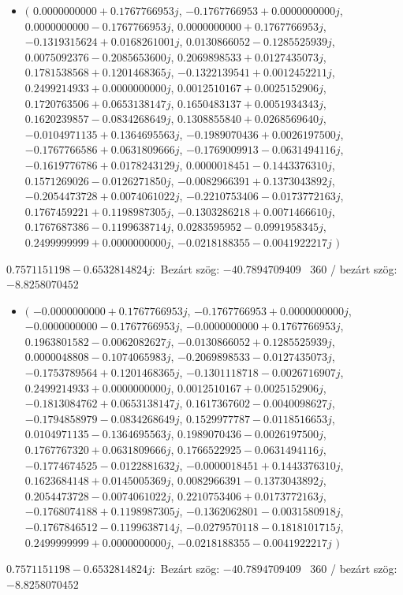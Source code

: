 \documentclass[14pt,a4paper]{article}
\begin{document}
\begin{itemize}
\item
$\big($
$0.0000000000+0.1767766953j$, $-0.1767766953+0.0000000000j$, $0.0000000000-0.1767766953j$, $0.0000000000+0.1767766953j$, $-0.1319315624+0.0168261001j$, $0.0130866052-0.1285525939j$, $0.0075092376-0.2085653600j$, $0.2069898533+0.0127435073j$, $0.1781538568+0.1201468365j$, $-0.1322139541+0.0012452211j$, $0.2499214933+0.0000000000j$, $0.0012510167+0.0025152906j$, $0.1720763506+0.0653138147j$, $0.1650483137+0.0051934343j$, $0.1620239857-0.0834268649j$, $0.1308855840+0.0268569640j$, $-0.0104971135+0.1364695563j$, $-0.1989070436+0.0026197500j$, $-0.1767766586+0.0631809666j$, $-0.1769009913-0.0631494116j$, $-0.1619776786+0.0178243129j$, $0.0000018451-0.1443376310j$, $0.1571269026-0.0126271850j$, $-0.0082966391+0.1373043892j$, $-0.2054473728+0.0074061022j$, $-0.2210753406-0.0173772163j$, $0.1767459221+0.1198987305j$, $-0.1303286218+0.0071466610j$, $0.1767687386-0.1199638714j$, $0.0283595952-0.0991958345j$, $0.2499999999+0.0000000000j$, $-0.0218188355-0.0041922217j$
$\big)$
\end{itemize}
$0.7571151198-0.6532814824j$:\
Bezárt szög: $-40.7894709409$ \
360 / bezárt szög: $-8.8258070452$\
\begin{itemize}
\item
$\big($
$-0.0000000000+0.1767766953j$, $-0.1767766953+0.0000000000j$, $-0.0000000000-0.1767766953j$, $-0.0000000000+0.1767766953j$, $0.1963801582-0.0062082627j$, $-0.0130866052+0.1285525939j$, $0.0000048808-0.1074065983j$, $-0.2069898533-0.0127435073j$, $-0.1753789564+0.1201468365j$, $-0.1301118718-0.0026716907j$, $0.2499214933+0.0000000000j$, $0.0012510167+0.0025152906j$, $-0.1813084762+0.0653138147j$, $0.1617367602-0.0040098627j$, $-0.1794858979-0.0834268649j$, $0.1529977787-0.0118516653j$, $0.0104971135-0.1364695563j$, $0.1989070436-0.0026197500j$, $0.1767767320+0.0631809666j$, $0.1766522925-0.0631494116j$, $-0.1774674525-0.0122881632j$, $-0.0000018451+0.1443376310j$, $0.1623684148+0.0145005369j$, $0.0082966391-0.1373043892j$, $0.2054473728-0.0074061022j$, $0.2210753406+0.0173772163j$, $-0.1768074188+0.1198987305j$, $-0.1362062801-0.0031580918j$, $-0.1767846512-0.1199638714j$, $-0.0279570118-0.1818101715j$, $0.2499999999+0.0000000000j$, $-0.0218188355-0.0041922217j$
$\big)$
\end{itemize}
$0.7571151198-0.6532814824j$:\
Bezárt szög: $-40.7894709409$ \
360 / bezárt szög: $-8.8258070452$\
\end{document}
